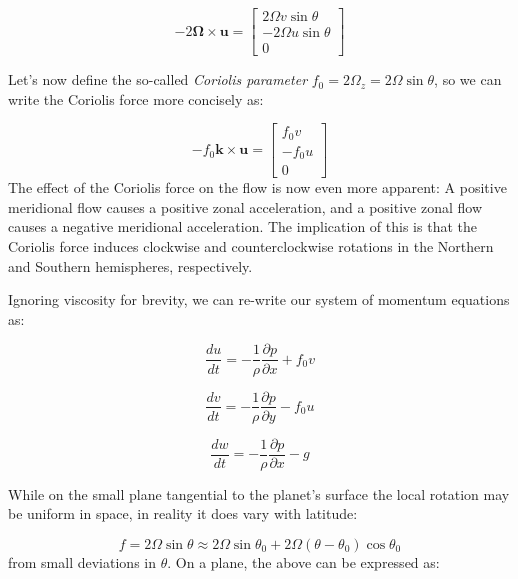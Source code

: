 \documentclass[12pt]{article}
\numberwithin{equation}{section}
\numberwithin{figure}{section}
\numberwithin{table}{section}
\begin{document}
\begin{equation}
  - 2 \mathbf{\Omega} \times \mathbf{u} =
  \begin{bmatrix}
    2 \Omega v \sin\theta \\
    - 2 \Omega u \sin\theta \\
    0
  \end{bmatrix}
\end{equation}

Let's now define the so-called \textit{Coriolis parameter}
$f_0 = 2 \Omega_z = 2 \Omega \sin\theta$, so we can write the Coriolis force
more concisely as:

\begin{equation}
  - f_0 \mathbf{k} \times \mathbf{u} =
  \begin{bmatrix}
    f_0 v \\
    - f_0 u \\
    0
  \end{bmatrix}
\end{equation}
The effect of the Coriolis force on the flow is now even more apparent:
A positive meridional flow causes a positive zonal acceleration,
and a positive zonal flow causes a negative meridional acceleration.
The implication of this is that the Coriolis force induces clockwise and
counterclockwise rotations in the Northern and Southern hemispheres,
respectively.

Ignoring viscosity for brevity, we can re-write our system of momentum equations as:

\begin{equation}
  \frac{du}{dt} = - \frac{1}{\rho} \frac{\partial p}{\partial x} + f_0 v
\end{equation}

\begin{equation}
  \frac{dv}{dt} = - \frac{1}{\rho} \frac{\partial p}{\partial y} - f_0 u
\end{equation}

\begin{equation}
  \frac{dw}{dt} = - \frac{1}{\rho} \frac{\partial p}{\partial x} - g
\end{equation}

While on the small plane tangential to the planet's surface the local rotation
may be uniform in space, in reality it does vary with latitude:

\begin{equation}
  f = 2 \Omega \sin\theta \approx 2\Omega \sin\theta_0 + 2\Omega (\theta - \theta_0) \cos\theta_0
\end{equation}
from small deviations in $\theta$.
On a plane, the above can be expressed as:
\end{document}
